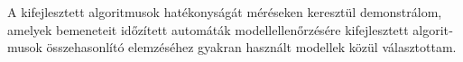 \begin{otherlanguage}{magyar}
	A kifejlesztett algoritmusok hatékonyságát méréseken keresztül demonstrálom, amelyek bemeneteit időzített automáták modellellenőrzésére kifejlesztett algoritmusok összehasonlító elemzéséhez gyakran használt modellek közül választottam.
	
\end{otherlanguage}
